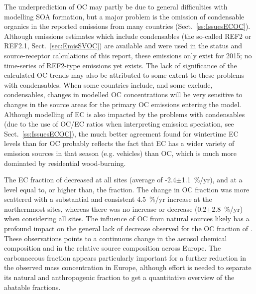 The underprediction of OC may partly be due to general difficulties with modelling SOA formation, but a major problem is the omission of condensable organics in the reported \pmfine emissions from many countries (Sect.~\ref{ss:IssuesECOC}). Although emissions estimates which include condensables (the so-called REF2 or REF2.1, Sect.~\ref{sec:EmisSVOC}) are available and were used in the status and source-receptor calculations of this report, these emissions only exist for 2015; no time-series of REF2-type emissions yet exists. The lack of significance of the calculated OC trends may also be attributed to some extent to these problems with condensables. When some countries include, and some exclude, condensables, changes in modelled OC concentrations will be very sensitive to changes in the source areas for the primary OC emissions entering the model.
Although modelling of EC is also impacted by the problems with condensables (due to the use of OC/EC ratios when interpreting \pmfine emission speciation, see Sect.~\ref{ss:IssuesECOC}), the much better agreement found for wintertime EC levels than for OC probably reflects the fact that EC has a wider variety of emission sources in that season (e.g. vehicles) than OC, which is much more dominated by residential wood-burning.


The EC fraction of \pmfine  decreased at all
sites (average of -2.4$\pm$1.1~\%/yr), and at a level equal to, or higher than, the  fraction. The
change in OC fraction was more scattered with a substantial and
consistent 4.5~\%/yr increase at the northernmost sites, whereas
there was no increase or decrease (0.2$\pm$2.8~\%/yr) when considering
all sites. The influence of OC from natural sources likely has a profound
impact on the general lack of decrease observed for the OC fraction of
\pmfine. These observations points to a continuous change in the aerosol
chemical composition and in the relative source composition across
Europe. The carbonaceous fraction appears particularly important for a
further reduction in the observed \pmfine mass concentration in Europe,
although effort is needed to separate its natural and anthropogenic
fraction to get a quantitative overview of the abatable fractions.
\\
\bigskip


